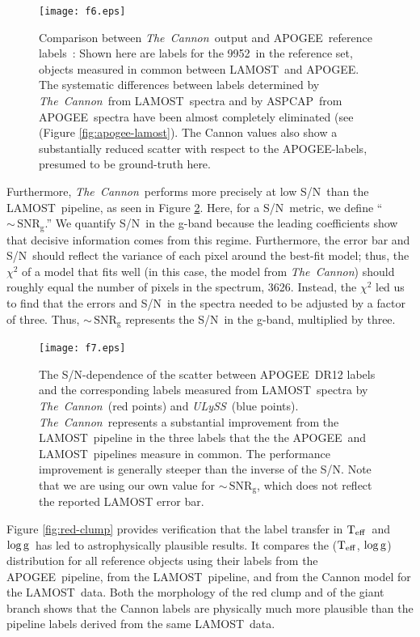 \documentclass[12pt, letterpaper, preprint]{aastex}
\newcommand{\tc}{\textsl{The~Cannon}}
\newcommand{\apogee}{APOGEE}
\newcommand{\aspcap}{ASPCAP}
\newcommand{\lamost}{LAMOST}
\newcommand{\ulyss}{\textsl{ULySS}}
\newcommand{\teff}{\mbox{$\rm T_{eff}$}}
\newcommand{\logg}{\mbox{$\rm \log g$}}
\newcommand{\ntrobj}{9952}
\newcommand{\snr}{S/N}
\begin{document}
\begin{figure}[!p]
\centering
\texttt{[image: f6.eps]}
\caption{Comparison between \tc\ output and \apogee\ reference labels~: Shown here are labels for the \ntrobj\ in the reference set, objects measured in common between \lamost\ and \apogee.
The systematic differences between labels determined by \tc\ from \lamost\ spectra and by \aspcap\ from \apogee\ spectra have been almost completely eliminated (see (Figure \ref{fig:apogee-lamost}).
The Cannon values also show a substantially reduced scatter with respect to the \apogee-labels, presumed to be ground-truth here.
}
\label{fig:apogee-cannon}
\end{figure}

Furthermore, \tc\ performs more precisely at low \snr\
than the \lamost\ pipeline, as seen in Figure \ref{fig:snr-test}. 
Here, for a \snr\ metric, we define ``$\sim\,\mathrm{SNR}_\mathrm{g}$.''
We quantify \snr\ in the g-band because the leading coefficients
show that decisive information comes from this regime.
Furthermore, the error bar and \snr\ should reflect the
variance of each pixel around the best-fit model; 
thus, the $\chi^2$ of a model that fits well (in this case, 
the model from \tc) should roughly equal the number of pixels in the spectrum, 3626. 
Instead, the $\chi^2$ led us to find that the errors and \snr\ in the spectra needed to be adjusted by a factor of three. 
Thus, $\sim\,\mathrm{SNR}_\mathrm{g}$ represents the \snr\ in the
g-band, multiplied by three.

\begin{figure}[!p]
\centering
\texttt{[image: f7.eps]}
\caption{The \snr-dependence of the scatter between
\apogee\ DR12 labels and the corresponding labels measured from
\lamost\ spectra by \tc\ (red points) and \ulyss\ (blue points).
\tc\ represents a substantial improvement from the
\lamost\ pipeline in the three labels that the 
the \apogee\ and \lamost\ pipelines measure in common.
The performance improvement is generally steeper than the
inverse of the \snr.
Note that we are using our own value for $\sim\,\mathrm{SNR}_\mathrm{g}$, which does not reflect
the reported LAMOST error bar.
}
\label{fig:snr-test}
\end{figure}

Figure \ref{fig:red-clump} provides verification that the label transfer in \teff\ and \logg\ has led to astrophysically plausible results. It compares the (\teff, \logg) distribution for all reference objects using their labels from the \apogee\ pipeline, from the \lamost\ pipeline, and from the Cannon model for the \lamost\  data. Both the morphology of the red clump and of the giant branch shows that the Cannon labels are physically much more plausible than the pipeline labels derived from the same \lamost\ data.  
\end{document}
